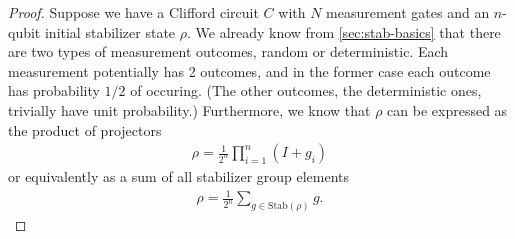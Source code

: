 \begin{proof}
Suppose we have a Clifford circuit $C$ with $N$ measurement gates and an
$n$-qubit initial stabilizer state $\rho$. We already
know from \cref{sec:stab-basics} that there are two types of measurement
outcomes, random or deterministic. Each measurement potentially has 2 outcomes,
and in the former case each outcome has probability $1 / 2$ of occuring. (The
other outcomes, the deterministic ones, trivially have unit probability.)
Furthermore, we know that $\rho$ can be expressed as the product of projectors
\begin{align}
  \rho = \frac{1}{2^n} \prod_{i=1}^n (I + g_i)
\end{align}
or equivalently as a sum of all stabilizer group elements
\begin{align}
  \rho = \frac{1}{2^n} \sum_{g\in \mathrm{Stab}(\rho)} g
.\end{align}


\end{proof}
